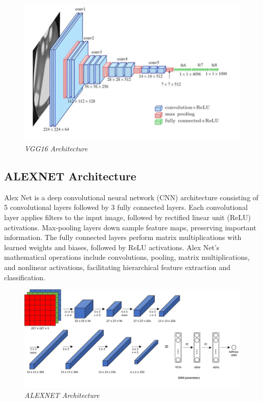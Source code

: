 \documentclass[12pt, a4paper]{report}
\begin{document}
\begin{figure}[htbp]
    \includegraphics[width=1\textwidth]{report images/image5.png}
    \caption[VGG16 Architecture]{\textit{VGG16 Architecture}}
\end{figure}

\subsection{ALEXNET Architecture}
Alex Net is a deep convolutional neural network (CNN) architecture consisting of 5 convolutional layers followed by 3 fully connected layers. Each convolutional layer applies filters to the input image, followed by rectified linear unit (ReLU) activations. Max-pooling layers down sample feature maps, preserving important information. The fully connected layers perform matrix multiplications with learned weights and biases, followed by ReLU
activations. Alex Net’s mathematical operations include convolutions, pooling, matrix multiplications, and nonlinear activations, facilitating hierarchical feature extraction and classification.

\begin{figure}[htbp]
    \includegraphics[width=1\textwidth]{report images/image6.png}
    \caption[ALEXNET Architecture]{\textit{ALEXNET Architecture}}
\end{figure}
\end{document}

